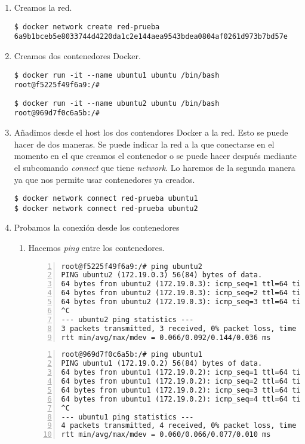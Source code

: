 			\begin{enumerate}
				\item Creamos la red.
				\begin{lstlisting}[style=consola]
$ docker network create red-prueba
6a9b1bceb5e8033744d4220da1c2e144aea9543bdea0804af0261d973b7bd57e
				\end{lstlisting}
			
				\item Creamos dos contenedores Docker.
				\begin{lstlisting}[style=consola]
$ docker run -it --name ubuntu1 ubuntu /bin/bash
root@f5225f49f6a9:/# 
				\end{lstlisting}
				\begin{lstlisting}[style=consola]
$ docker run -it --name ubuntu2 ubuntu /bin/bash
root@969d7f0c6a5b:/# 
				\end{lstlisting}
				
				\item Añadimos desde el host los dos contendores Docker a la red. Esto se puede hacer de dos maneras. Se puede indicar la red a la que conectarse en el momento en el que creamos el contenedor o se puede hacer después mediante el subcomando \emph{connect} que tiene \emph{network}. Lo haremos de la segunda manera ya que nos permite usar contenedores ya creados.
				\begin{lstlisting}[style=consola]
$ docker network connect red-prueba ubuntu1
$ docker network connect red-prueba ubuntu2 
				\end{lstlisting}
				
				\item Probamos la conexión desde los contenedores
				\begin{enumerate}
					\item Hacemos \textit{ping} entre los contenedores.
					\begin{lstlisting}[style=consola,numbers=left]
root@f5225f49f6a9:/# ping ubuntu2
PING ubuntu2 (172.19.0.3) 56(84) bytes of data.
64 bytes from ubuntu2 (172.19.0.3): icmp_seq=1 ttl=64 time=0.144 ms
64 bytes from ubuntu2 (172.19.0.3): icmp_seq=2 ttl=64 time=0.066 ms
64 bytes from ubuntu2 (172.19.0.3): icmp_seq=3 ttl=64 time=0.066 ms
^C
--- ubuntu2 ping statistics ---
3 packets transmitted, 3 received, 0% packet loss, time 1998ms
rtt min/avg/max/mdev = 0.066/0.092/0.144/0.036 ms
					\end{lstlisting}
					\begin{lstlisting}[style=consola,numbers=left]
root@969d7f0c6a5b:/# ping ubuntu1
PING ubuntu1 (172.19.0.2) 56(84) bytes of data.
64 bytes from ubuntu1 (172.19.0.2): icmp_seq=1 ttl=64 time=0.062 ms
64 bytes from ubuntu1 (172.19.0.2): icmp_seq=2 ttl=64 time=0.077 ms
64 bytes from ubuntu1 (172.19.0.2): icmp_seq=3 ttl=64 time=0.060 ms
64 bytes from ubuntu1 (172.19.0.2): icmp_seq=4 ttl=64 time=0.067 ms
^C
--- ubuntu1 ping statistics ---
4 packets transmitted, 4 received, 0% packet loss, time 2999ms
rtt min/avg/max/mdev = 0.060/0.066/0.077/0.010 ms
					\end{lstlisting}
					

\end{enumerate}
\end{enumerate}
